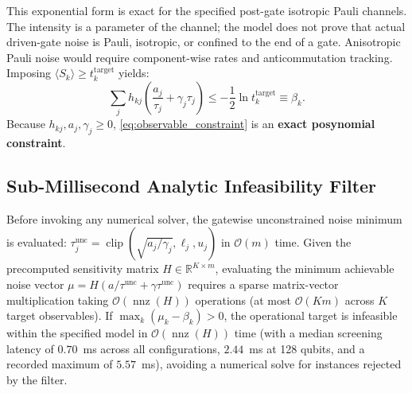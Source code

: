 \documentclass[10pt,letterpaper,journal]{IEEEtran}
\begin{document}
This exponential form is exact for the specified post-gate isotropic Pauli channels. The intensity is a parameter of the channel; the model does not prove that actual driven-gate noise is Pauli, isotropic, or confined to the end of a gate. Anisotropic Pauli noise would require component-wise rates and anticommutation tracking. Imposing $\langle S_k \rangle \ge t_k^{\mathrm{target}}$ yields:
\begin{equation}\label{eq:observable_constraint}
\sum_j h_{kj} \left( \frac{a_j}{\tau_j} + \gamma_j \tau_j \right) \le -\frac{1}{2} \ln t_k^{\mathrm{target}} \equiv \beta_k.
\end{equation}
Because $h_{kj}, a_j, \gamma_j \ge 0$, \eqref{eq:observable_constraint} is an \textbf{exact posynomial constraint}.

\subsection{Sub-Millisecond Analytic Infeasibility Filter}
Before invoking any numerical solver, the gatewise unconstrained noise minimum is evaluated: $\tau_j^{\mathrm{unc}} = \operatorname{clip}( \sqrt{a_j/\gamma_j}, \ell_j, u_j )$ in $\mathcal{O}(m)$ time. Given the precomputed sensitivity matrix $H \in \mathbb{R}^{K \times m}$, evaluating the minimum achievable noise vector $\mu = H (a/\tau^{\mathrm{unc}} + \gamma\tau^{\mathrm{unc}})$ requires a sparse matrix-vector multiplication taking $\mathcal{O}(\operatorname{nnz}(H))$ operations (at most $\mathcal{O}(Km)$ across $K$ target observables). If $\max_k (\mu_k - \beta_k) > 0$, the operational target is infeasible within the specified model in $\mathcal{O}(\operatorname{nnz}(H))$ time (with a median screening latency of $0.70$~ms across all configurations, $2.44$~ms at 128 qubits, and a recorded maximum of $5.57$~ms), avoiding a numerical solve for instances rejected by the filter.
\end{document}
